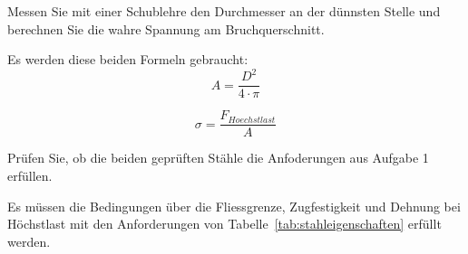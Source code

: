 \begin{questions}
    \question
    Messen Sie mit einer Schublehre den Durchmesser an der dünnsten Stelle und berechnen Sie die wahre Spannung am Bruchquerschnitt.

    \begin{solution}
        Es werden diese beiden Formeln gebraucht:
        \begin{equation*}
            A = \dfrac{D^2}{4\cdot \pi}
        \end{equation*}

        \begin{equation*}
            \sigma = \dfrac{F_{Hoechstlast}}{A}
        \end{equation*}

    \end{solution}


    \question
    Prüfen Sie, ob die beiden geprüften Stähle die Anfoderungen aus Aufgabe 1 erfüllen.

    \begin{solution}
        Es müssen die Bedingungen über die Fliessgrenze, Zugfestigkeit und Dehnung bei Höchstlast mit den Anforderungen von Tabelle~\ref{tab:stahleigenschaften} erfüllt werden.

    \end{solution}






\end{questions}
